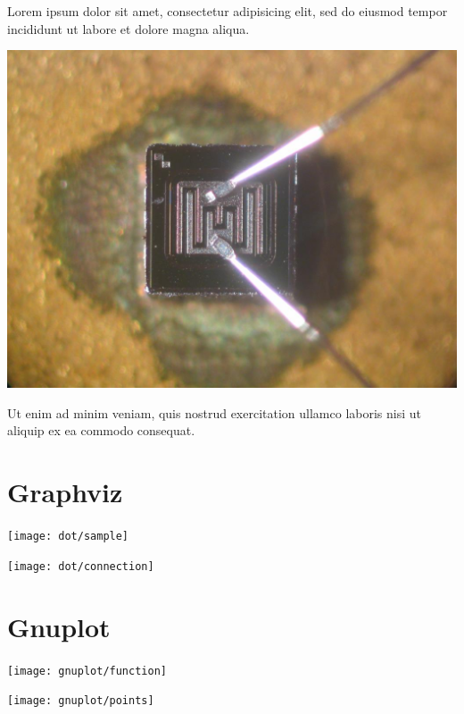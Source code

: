 {
Lorem ipsum dolor sit amet, consectetur adipisicing elit, sed do eiusmod tempor incididunt ut labore et dolore magna aliqua.

\begin{center}
\includegraphics[scale=0.1]{pic/transistor}
\end{center}

Ut enim ad minim veniam, quis nostrud exercitation ullamco laboris nisi ut aliquip ex ea commodo consequat.
}


\section{Graphviz}


{
\vspace{-1em}
\begin{center}
\texttt{[image: dot/sample]}
\end{center}
}


{
\vspace{-1em}
\begin{center}
\texttt{[image: dot/connection]}
\end{center}
}


\section{Gnuplot}


{
\begin{center}
\texttt{[image: gnuplot/function]}
\end{center}
}


{
\begin{center}
\texttt{[image: gnuplot/points]}
\end{center}
}

